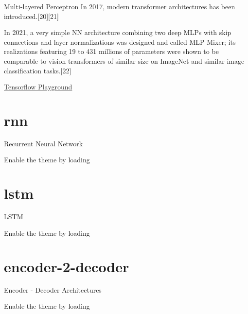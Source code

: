\documentclass[10pt]{beamer}
\begin{document}
\begin{frame}[fragile]{ Multi-layered Perceptron }
	In 2017, modern transformer architectures has been introduced.[20][21]

	In 2021, a very simple NN architecture combining two deep MLPs with skip connections and layer normalizations
	was designed and called MLP-Mixer; its realizations featuring 19 to 431 millions of parameters were shown to be
	comparable to vision transformers of similar size on ImageNet and similar image classification tasks.[22]

	\href{https://playground.tensorflow.org/#activation=tanh&batchSize=10&dataset=circle&regDataset=reg-plane&learningRate=0.03&regularizationRate=0&noise=0&networkShape=4,2&seed=0.15458&showTestData=false&discretize=false&percTrainData=50&x=true&y=true&xTimesY=false&xSquared=false&ySquared=false&cosX=false&sinX=false&cosY=false&sinY=false&collectStats=false&problem=classification&initZero=false&hideText=false}{Tensorflow Playground}

\end{frame}

\section[Recurrent Neural Network]{rnn}

\begin{frame}[fragile]{Recurrent Neural Network}

	Enable the theme by loading

\end{frame}

\section[LSTM]{lstm}

\begin{frame}[fragile]{LSTM}

	Enable the theme by loading

\end{frame}



\section[Encoder - Decoder]{encoder-2-decoder}

\begin{frame}[fragile]{Encoder - Decoder Architectures}

	Enable the theme by loading

\end{frame}
\end{document}

